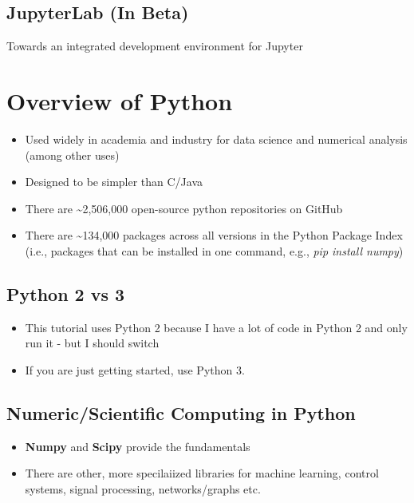 \documentclass[11pt]{article}
\providecommand{\tightlist}{%
      \setlength{\itemsep}{0pt}\setlength{\parskip}{0pt}}
\begin{document}
    \subsection{JupyterLab (In Beta)}\label{jupyterlab-in-beta}

Towards an integrated development environment for Jupyter

    \section{Overview of Python}\label{overview-of-python}

\begin{itemize}
\tightlist
\item
  Used widely in academia and industry for data science and numerical
  analysis (among other uses)
\item
  Designed to be simpler than C/Java
\item
  There are \textasciitilde{}2,506,000 open-source python repositories
  on GitHub
\item
  There are \textasciitilde{}134,000 packages across all versions in the
  Python Package Index (i.e., packages that can be installed in one
  command, e.g., \emph{pip install numpy})
\end{itemize}

    \subsection{Python 2 vs 3}\label{python-2-vs-3}

\begin{itemize}
\tightlist
\item
  This tutorial uses Python 2 because I have a lot of code in Python 2
  and only run it - but I should switch
\item
  If you are just getting started, use Python 3.
\end{itemize}

    \subsection{Numeric/Scientific Computing in
Python}\label{numericscientific-computing-in-python}

\begin{itemize}
\tightlist
\item
  \textbf{Numpy} and \textbf{Scipy} provide the fundamentals
\item
  There are other, more specilaiized libraries for machine learning,
  control systems, signal processing, networks/graphs etc.
\end{itemize}
\end{document}

